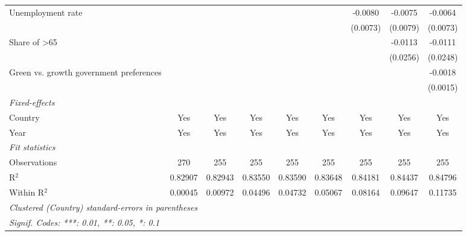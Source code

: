 \begin{table}[htbp]
\begin{tabular}{lcccccccc}
      Unemployment rate                       &          &          &              &              &              & -0.0080      & -0.0075       & -0.0064\\   
                                              &          &          &              &              &              & (0.0073)     & (0.0079)      & (0.0073)\\   
      Share of >65                            &          &          &              &              &              &              & -0.0113       & -0.0111\\   
                                              &          &          &              &              &              &              & (0.0256)      & (0.0248)\\   
      Green vs. growth government preferences &          &          &              &              &              &              &               & -0.0018\\   
                                              &          &          &              &              &              &              &               & (0.0015)\\   
      \midrule
      \emph{Fixed-effects}\\
      Country                                 & Yes      & Yes      & Yes          & Yes          & Yes          & Yes          & Yes           & Yes\\  
      Year                                    & Yes      & Yes      & Yes          & Yes          & Yes          & Yes          & Yes           & Yes\\  
      \midrule
      \emph{Fit statistics}\\
      Observations                            & 270      & 255      & 255          & 255          & 255          & 255          & 255           & 255\\  
      R$^2$                                   & 0.82907  & 0.82943  & 0.83550      & 0.83590      & 0.83648      & 0.84181      & 0.84437       & 0.84796\\  
      Within R$^2$                            & 0.00045  & 0.00972  & 0.04496      & 0.04732      & 0.05067      & 0.08164      & 0.09647       & 0.11735\\  
      \midrule \midrule
      \multicolumn{9}{l}{\emph{Clustered (Country) standard-errors in parentheses}}\\
      \multicolumn{9}{l}{\emph{Signif. Codes: ***: 0.01, **: 0.05, *: 0.1}}\\
   \end{tabular}
\end{table}


